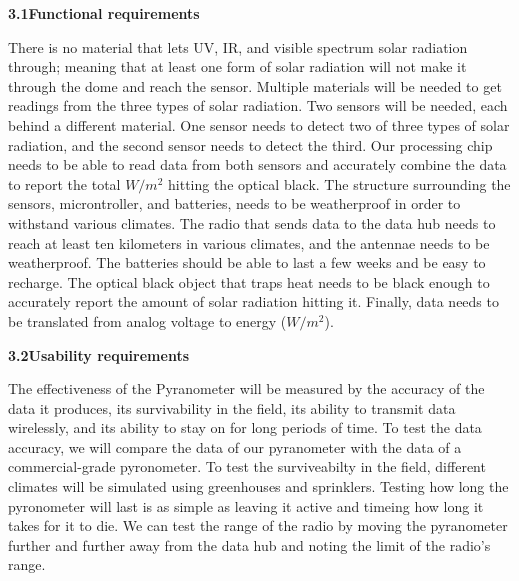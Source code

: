 \documentclass[10pt,draftclsnofoot,onecolumn,letterpaper]{article}
\begin{document}
{\fontsize{10pt}{12.0pt} \textbf{3.1\quad Functional requirements}\\\selectfont 
\par}\par
{\fontsize{10pt}{12.0pt} There is no material that lets UV, IR, and visible spectrum solar radiation through; meaning that at least one form of solar radiation will not make it through the dome and reach the sensor. Multiple materials will be needed to get readings from the three types of solar radiation. Two sensors will be needed, each behind a different material. One sensor needs to detect two of three types of solar radiation, and the second sensor needs to detect the third. Our processing chip needs to be able to read data from both sensors and accurately combine the data to report the total $W/m^2$ hitting the optical black. The structure surrounding the sensors, microntroller, and batteries, needs to be weatherproof in order to withstand various climates. The radio that sends data to the data hub needs to reach at least ten kilometers in various climates, and the antennae needs to be weatherproof. The batteries should be able to last a few weeks and be easy to recharge. The optical black object that traps heat needs to be black enough to accurately report the amount of solar radiation hitting it. Finally, data needs to be translated from analog voltage to energy ($W/m^2$).\\\selectfont 
\par}\par

{\fontsize{10pt}{12.0pt} \textbf{3.2\quad Usability requirements}\\\selectfont 
\par}\par
{\fontsize{10pt}{12.0pt} The effectiveness of the Pyranometer will be measured by the accuracy of the data it produces, its survivability in the field, its ability to transmit data wirelessly, and its ability to stay on for long periods of time. To test the data accuracy, we will compare the data of our pyranometer with the data of a commercial-grade pyronometer. To test the surviveabilty in the field, different climates will be simulated using greenhouses and sprinklers. Testing how long the pyronometer will last is as simple as leaving it active and timeing how long it takes for it to die. We can test the range of the radio by moving the pyranometer further and further away from the data hub and noting the limit of the radio's range.\\\selectfont 
\par}\par
\end{document}
